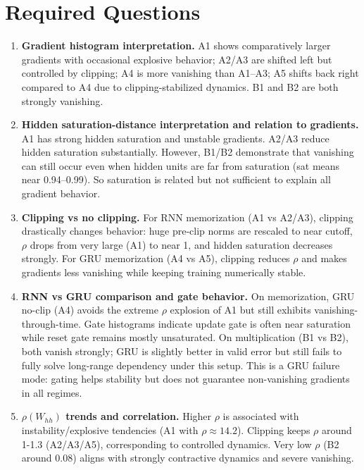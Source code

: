 \documentclass[11pt]{article}
\begin{document}
\section{Required Questions}
\begin{enumerate}
\item \textbf{Gradient histogram interpretation.}
A1 shows comparatively larger gradients with occasional explosive behavior; A2/A3 are shifted left but controlled by clipping; A4 is more vanishing than A1--A3; A5 shifts back right compared to A4 due to clipping-stabilized dynamics. B1 and B2 are both strongly vanishing.

\item \textbf{Hidden saturation-distance interpretation and relation to gradients.}
A1 has strong hidden saturation and unstable gradients. A2/A3 reduce hidden saturation substantially. However, B1/B2 demonstrate that vanishing can still occur even when hidden units are far from saturation (sat means near 0.94--0.99). So saturation is related but not sufficient to explain all gradient behavior.

\item \textbf{Clipping vs no clipping.}
For RNN memorization (A1 vs A2/A3), clipping drastically changes behavior: huge pre-clip norms are rescaled to near cutoff, $\rho$ drops from very large (A1) to near 1, and hidden saturation decreases strongly. For GRU memorization (A4 vs A5), clipping reduces $\rho$ and makes gradients less vanishing while keeping training numerically stable.

\item \textbf{RNN vs GRU comparison and gate behavior.}
On memorization, GRU no-clip (A4) avoids the extreme $\rho$ explosion of A1 but still exhibits vanishing-through-time. Gate histograms indicate update gate is often near saturation while reset gate remains mostly unsaturated. On multiplication (B1 vs B2), both vanish strongly; GRU is slightly better in valid error but still fails to fully solve long-range dependency under this setup. This is a GRU failure mode: gating helps stability but does not guarantee non-vanishing gradients in all regimes.

\item \textbf{$\rho(W_{hh})$ trends and correlation.}
Higher $\rho$ is associated with instability/explosive tendencies (A1 with $\rho\approx14.2$). Clipping keeps $\rho$ around 1-1.3 (A2/A3/A5), corresponding to controlled dynamics. Very low $\rho$ (B2 around 0.08) aligns with strongly contractive dynamics and severe vanishing.
\end{enumerate}
\end{document}
